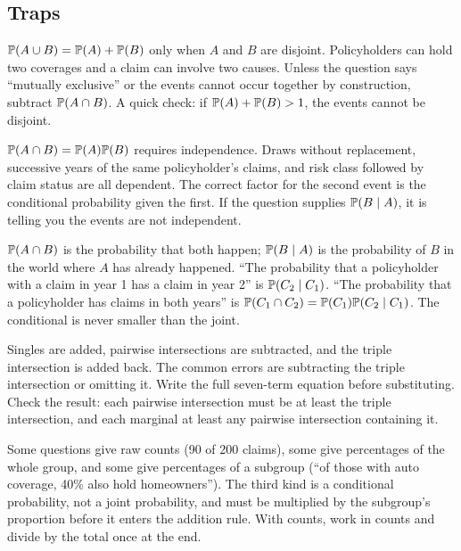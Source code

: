 \subsection{Traps}

\begin{trap}
$\mathbb{P}(A \cup B) = \mathbb{P}(A) + \mathbb{P}(B)$ only when $A$ and $B$ are disjoint. Policyholders can hold
two coverages and a claim can involve two causes. Unless the
question says ``mutually exclusive'' or the events cannot occur together by construction, subtract
$\mathbb{P}(A \cap B)$. A quick check: if $\mathbb{P}(A) + \mathbb{P}(B) > 1$, the events cannot be disjoint.
\end{trap}

\begin{trap}
$\mathbb{P}(A \cap B) = \mathbb{P}(A)\mathbb{P}(B)$ requires independence. Draws without replacement, successive
years of the same policyholder's claims, and risk class followed by claim status are all dependent.
The correct factor for the second event is the conditional probability given the first. If the
question supplies $\mathbb{P}(B \mid A)$, it is telling you the events are not independent.
\end{trap}

\begin{trap}
$\mathbb{P}(A \cap B)$ is the probability that both happen; $\mathbb{P}(B \mid A)$ is the probability of $B$
in the world where $A$ has already happened. ``The probability that a policyholder with a claim
in year 1 has a claim in year 2'' is $\mathbb{P}(C_2 \mid C_1)$. ``The probability that a policyholder
has claims in both years'' is $\mathbb{P}(C_1 \cap C_2) = \mathbb{P}(C_1)\mathbb{P}(C_2 \mid C_1)$. The
conditional is never smaller than the joint.
\end{trap}

\begin{trap}
Singles are added, pairwise intersections are subtracted, and the triple intersection is added
back. The common errors are subtracting the triple intersection or omitting it. Write the full
seven-term equation before substituting. Check the result: each pairwise intersection must be at
least the triple intersection, and each marginal at least any pairwise intersection containing it.
\end{trap}

\begin{trap}
Some questions give raw counts (90 of 200 claims), some give percentages of the whole group, and
some give percentages of a subgroup (``of those with auto coverage, 40\% also hold homeowners'').
The third kind is a conditional probability, not a joint probability, and must be multiplied by
the subgroup's proportion before it enters the addition rule. With counts, work in counts and
divide by the total once at the end.
\end{trap}


